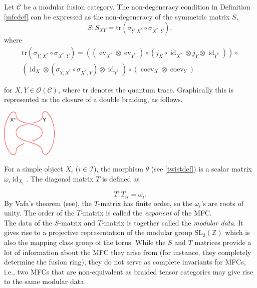 \documentclass[a4paper, 10pt]{book}
\theoremstyle{definition}
\numberwithin{equation}{chapter}
\newcommand\id{\operatorname{id}}
\newcommand\Z{\mathbb Z}
\newcommand\C{\mathcal C}
\newcommand\Cat{\mathcal C}
\newcommand\OO{\mathcal O}
\newcommand\ev{\operatorname{ev}}
\newcommand\coev{\operatorname{coev}}
\begin{document}
Let $\C$ be a modular fusion category. The non-degeneracy condition in Definition \ref{mfcdef} can be expressed as the non-degeneracy of the symmetric matrix $S$, 
\begin{equation}\label{S}
	S: S_{XY}= \text{tr}(\sigma_{Y,X^*}\circ\sigma_{X^*,Y}),
\end{equation}
where \begin{align}
	\text{tr}(\sigma_{Y,X^*}\circ\sigma_{X^*,Y}) = ((\ev_{X^*}\otimes \ev_{Y^*}) \circ (j_{X}\circ\id_{X^*} \otimes j_Y \otimes \id_{Y^*}))\circ\\ (\id_X\otimes (\sigma_{Y,X^*}\circ\sigma_{X^*, Y}) \otimes \id_{Y^*})\circ (\coev_X \otimes \coev_Y) \label{Strace}
\end{align}

for $X,Y \in \mathcal{\OO(\Cat)}$, where tr denotes the quantum trace. Graphically this is represented as the closure of a double braiding, as follows.
\begin{center}
\includegraphics[width=0.2\textwidth]{s-matrix.eps}
\end{center}
For a simple object $X_i$ ($i\in \mathcal{I}$), the morphism $\theta$ (see \ref{twistdef}) is a scalar matrix $\omega_i \id_{X_i}$. The diagonal matrix $T$ is defined as 

\begin{equation}\label{T}
	T: T_{ii} = \omega_i.
\end{equation}
By Vafa's theorem (see\cite[Theorem 3.1.19]{BK}), the $T$-matrix has finite order, so the $\omega_i$'s are roots of unity. The order of the $T$-matrix is called the \textit{exponent} of the MFC.\\
The data of the $S$-matrix and $T$-matrix is together called the \textit{modular data}. It gives rise to a projective representation of the modular group $\text{SL}_2(\Z)$ which is also the mapping class group of the torus. While the $S$ and $T$ matrices provide a lot of information about the MFC they arise from (for instance, they completely determine the fusion ring), they do not serve as complete invariants for MFCs, i.e., two MFCs that are non-equivalent as braided tensor categories may give rise to the same modular data \cite{2017arXiv170802796M}.
\end{document}
